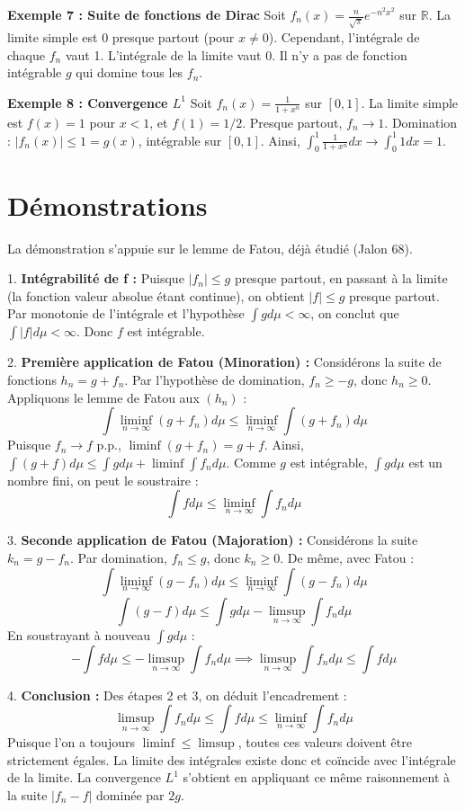 \documentclass[11pt,a4paper]{article}
\begin{document}
\textbf{Exemple 7 : Suite de fonctions de Dirac}
Soit $f_n(x) = \frac{n}{\sqrt{\pi}} e^{-n^2x^2}$ sur $\mathbb{R}$.
La limite simple est 0 presque partout (pour $x \ne 0$).
Cependant, l'intégrale de chaque $f_n$ vaut 1.
L'intégrale de la limite vaut 0.
Il n'y a pas de fonction intégrable $g$ qui domine tous les $f_n$.

\textbf{Exemple 8 : Convergence $L^1$}
Soit $f_n(x) = \frac{1}{1+x^n}$ sur $[0, 1]$.
La limite simple est $f(x) = 1$ pour $x < 1$, et $f(1) = 1/2$.
Presque partout, $f_n \to 1$.
Domination : $|f_n(x)| \le 1 = g(x)$, intégrable sur $[0, 1]$.
Ainsi, $\int_0^1 \frac{1}{1+x^n} dx \to \int_0^1 1 dx = 1$.

\section{Démonstrations}

La démonstration s'appuie sur le lemme de Fatou, déjà étudié (Jalon 68).

1. \textbf{Intégrabilité de f :}
   Puisque $|f_n| \le g$ presque partout, en passant à la limite (la fonction valeur absolue étant continue), on obtient $|f| \le g$ presque partout. Par monotonie de l'intégrale et l'hypothèse $\int g d\mu < \infty$, on conclut que $\int |f| d\mu < \infty$. Donc $f$ est intégrable.

2. \textbf{Première application de Fatou (Minoration) :}
   Considérons la suite de fonctions $h_n = g + f_n$. Par l'hypothèse de domination, $f_n \ge -g$, donc $h_n \ge 0$.
   Appliquons le lemme de Fatou aux $(h_n)$ :
   $$\int \liminf_{n \to \infty} (g + f_n) d\mu \le \liminf_{n \to \infty} \int (g + f_n) d\mu$$
   Puisque $f_n \to f$ p.p., $\liminf (g + f_n) = g + f$.
   Ainsi, $\int (g + f) d\mu \le \int g d\mu + \liminf \int f_n d\mu$.
   Comme $g$ est intégrable, $\int g d\mu$ est un nombre fini, on peut le soustraire :
   $$\int f d\mu \le \liminf_{n \to \infty} \int f_n d\mu$$

3. \textbf{Seconde application de Fatou (Majoration) :}
   Considérons la suite $k_n = g - f_n$. Par domination, $f_n \le g$, donc $k_n \ge 0$.
   De même, avec Fatou :
   $$\int \liminf_{n \to \infty} (g - f_n) d\mu \le \liminf_{n \to \infty} \int (g - f_n) d\mu$$
   $$\int (g - f) d\mu \le \int g d\mu - \limsup_{n \to \infty} \int f_n d\mu$$
   En soustrayant à nouveau $\int g d\mu$ :
   $$-\int f d\mu \le -\limsup_{n \to \infty} \int f_n d\mu \implies \limsup_{n \to \infty} \int f_n d\mu \le \int f d\mu$$

4. \textbf{Conclusion :}
   Des étapes 2 et 3, on déduit l'encadrement :
   $$\limsup_{n \to \infty} \int f_n d\mu \le \int f d\mu \le \liminf_{n \to \infty} \int f_n d\mu$$
   Puisque l'on a toujours $\liminf \le \limsup$, toutes ces valeurs doivent être strictement égales.
   La limite des intégrales existe donc et coïncide avec l'intégrale de la limite. La convergence $L^1$ s'obtient en appliquant ce même raisonnement à la suite $|f_n - f|$ dominée par $2g$.
\end{document}
